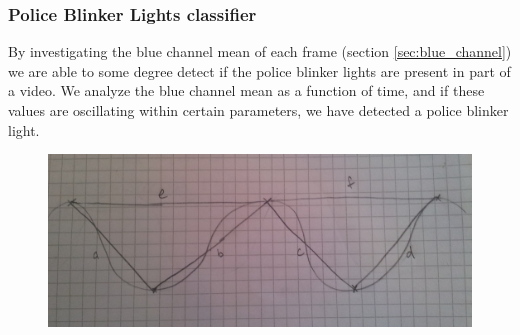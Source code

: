 \subsubsection{Police Blinker Lights classifier}\label{sec:police_detection}
%
By investigating the blue channel mean of each frame (section \ref{sec:blue_channel}) we are able to some degree detect if the police blinker lights are present in part of a video. We analyze the blue channel mean as a function of time, and if these values are oscillating within certain parameters, we have detected a police blinker light.
%
\begin{figure}[h]
     \centering
     \includegraphics[width=1.05\textwidth]{img/triangles.jpg}
     \caption{}\label{fig:triangles}
\end{figure}\\
